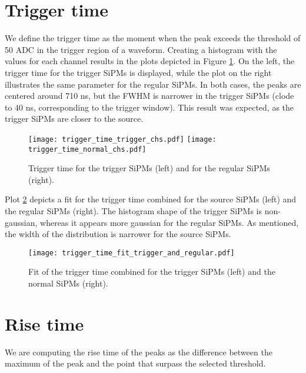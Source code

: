 \documentclass[11pt,a4paper,english,oneside, pdf]{article}
\begin{document}
	
	\clearpage
	
	\section{Trigger time}
	
	We define the trigger time as the moment when the peak exceeds the threshold of 50 ADC in the trigger region of a waveform. Creating a histogram with the values for each channel results in the plots depicted in Figure \ref{fig:trigger_time}. On the left, the trigger time for the trigger SiPMs is displayed, while the plot on the right illustrates the same parameter for the regular SiPMs. In both cases, the peaks are centered around 710 ns, but the FWHM is narrower in the trigger SiPMs (clode to 40 ns, corresponding to the trigger window). This result was expected, as the trigger SiPMs are closer to the source.
	
	\begin{figure}[!h]
		\centering
		\texttt{[image: trigger\_time\_trigger\_chs.pdf]}
		\texttt{[image: trigger\_time\_normal\_chs.pdf]}
		\caption{Trigger time for the trigger SiPMs (left) and for the regular SiPMs (right).}
		\label{fig:trigger_time}
	\end{figure}

	
	Plot \ref{fig:trigger_time_fit_trigger_and_regular} depicts a fit for the trigger time combined for the source SiPMs (left) and the regular SiPMs (right). The histogram shape of the trigger SiPMs is non-gaussian, whereas it appears more gaussian for the regular SiPMs. As mentioned, the width of the distribution is narrower for the source SiPMs.
	
	\begin{figure}[!h]
		\begin{center}
			\texttt{[image: trigger\_time\_fit\_trigger\_and\_regular.pdf]}
			\caption{Fit of the trigger time combined for the trigger SiPMs (left) and the normal SiPMs (right).}
			\label{fig:trigger_time_fit_trigger_and_regular}
		\end{center}
	\end{figure}
	
	
	\clearpage
	
	\section{Rise time}
	
	We are computing the rise time of the peaks as the difference between the maximum of the peak and the point that surpass the selected threshold.
	
\end{document}
